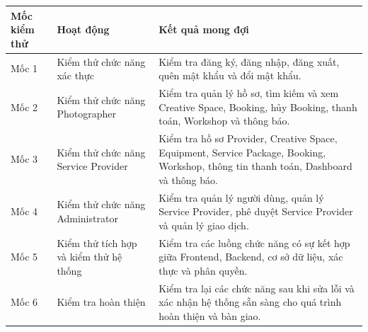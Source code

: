 \begin{longtable}{|>{\raggedright\arraybackslash}p{}|
		>{\raggedright\arraybackslash}p{}|
		>{\raggedright\arraybackslash}p{}|}
	\hline
	
	\textbf{Mốc kiểm thử} &
	\textbf{Hoạt động} &
	\textbf{Kết quả mong đợi} \\
	\hline
	
	Mốc 1 &
	Kiểm thử chức năng xác thực &
	Kiểm tra đăng ký, đăng nhập, đăng xuất, quên mật khẩu và đổi mật khẩu. \\
	\hline
	
	Mốc 2 &
	Kiểm thử chức năng Photographer &
	Kiểm tra quản lý hồ sơ, tìm kiếm và xem Creative Space, Booking, hủy Booking, thanh toán, Workshop và thông báo. \\
	\hline
	
	Mốc 3 &
	Kiểm thử chức năng Service Provider &
	Kiểm tra hồ sơ Provider, Creative Space, Equipment, Service Package, Booking, Workshop, thông tin thanh toán, Dashboard và thông báo. \\
	\hline
	
	Mốc 4 &
	Kiểm thử chức năng Administrator &
	Kiểm tra quản lý người dùng, quản lý Service Provider, phê duyệt Service Provider và quản lý giao dịch. \\
	\hline
	
	Mốc 5 &
	Kiểm thử tích hợp và kiểm thử hệ thống &
	Kiểm tra các luồng chức năng có sự kết hợp giữa Frontend, Backend, cơ sở dữ liệu, xác thực và phân quyền. \\
	\hline
	
	Mốc 6 &
	Kiểm tra hoàn thiện &
	Kiểm tra lại các chức năng sau khi sửa lỗi và xác nhận hệ thống sẵn sàng cho quá trình hoàn thiện và bàn giao. \\
	\hline
	
\end{longtable}

